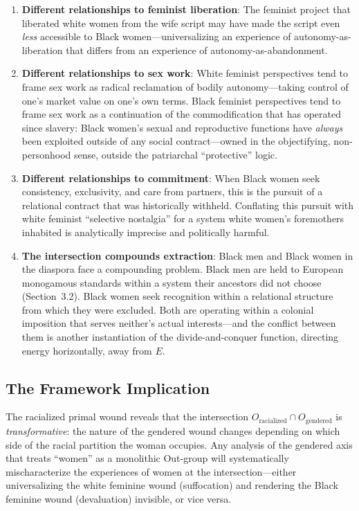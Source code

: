 \begin{enumerate}
    \item \textbf{Different relationships to feminist liberation}: The feminist project that liberated white women from the wife script may have made the script even \textit{less} accessible to Black women---universalizing an experience of autonomy-as-liberation that differs from an experience of autonomy-as-abandonment.
    
    \item \textbf{Different relationships to sex work}: White feminist perspectives tend to frame sex work as radical reclamation of bodily autonomy---taking control of one's market value on one's own terms. Black feminist perspectives tend to frame sex work as a continuation of the commodification that has operated since slavery: Black women's sexual and reproductive functions have \textit{always} been exploited outside of any social contract---owned in the objectifying, non-personhood sense, outside the patriarchal ``protective'' logic.
    
    \item \textbf{Different relationships to commitment}: When Black women seek consistency, exclusivity, and care from partners, this is the pursuit of a relational contract that was historically withheld. Conflating this pursuit with white feminist ``selective nostalgia'' for a system white women's foremothers inhabited is analytically imprecise and politically harmful.
    
    \item \textbf{The intersection compounds extraction}: Black men and Black women in the diaspora face a compounding problem. Black men are held to European monogamous standards within a system their ancestors did not choose (Section~3.2). Black women seek recognition within a relational structure from which they were excluded. Both are operating within a colonial imposition that serves neither's actual interests---and the conflict between them is another instantiation of the divide-and-conquer function, directing energy horizontally, away from $E$.
\end{enumerate}

\subsection{The Framework Implication}

The racialized primal wound reveals that the intersection $O_{\text{racialized}} \cap O_{\text{gendered}}$ is \textit{transformative}: the nature of the gendered wound changes depending on which side of the racial partition the woman occupies. Any analysis of the gendered axis that treats ``women'' as a monolithic Out-group will systematically mischaracterize the experiences of women at the intersection---either universalizing the white feminine wound (suffocation) and rendering the Black feminine wound (devaluation) invisible, or vice versa.

